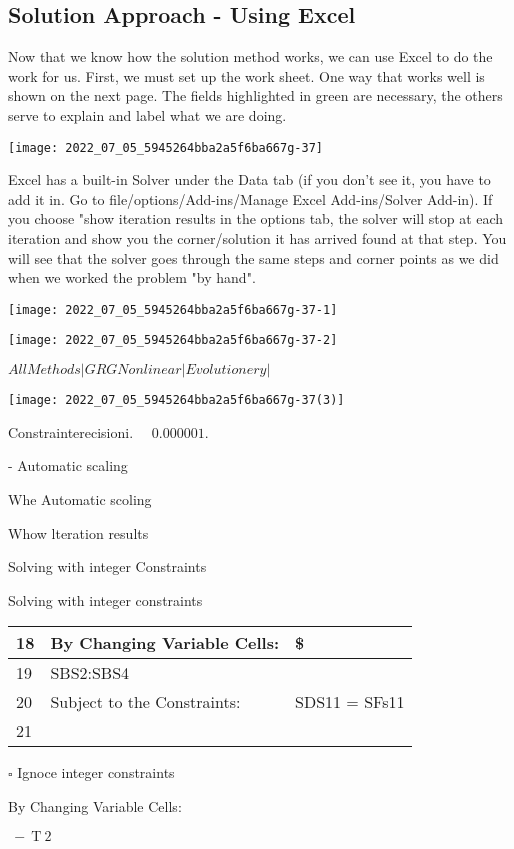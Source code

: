 \subsection{Solution Approach - Using Excel}
Now that we know how the solution method works, we can use Excel to do the work for us. First, we must set up the work sheet. One way that works well is shown on the next page. The fields highlighted in green are necessary, the others serve to explain and label what we are doing.

\texttt{[image: 2022\_07\_05\_5945264bba2a5f6ba667g-37]}

Excel has a built-in Solver under the Data tab (if you don't see it, you have to add it in. Go to file/options/Add-ins/Manage Excel Add-ins/Solver Add-in). If you choose "show iteration results in the options tab, the solver will stop at each iteration and show you the corner/solution it has arrived found at that step. You will see that the solver goes through the same steps and corner points as we did when we worked the problem "by hand".

\texttt{[image: 2022\_07\_05\_5945264bba2a5f6ba667g-37-1]}

\texttt{[image: 2022\_07\_05\_5945264bba2a5f6ba667g-37-2]}

$All Methods | GRG Nonlinear | Evolutionery |$

\texttt{[image: 2022\_07\_05\_5945264bba2a5f6ba667g-37(3)]}

Constrainterecisioni. $\quad 0.000001 .$

- Automatic scaling

Whe Automatic scoling

Whow lteration results

Solving with integer Constraints

Solving with integer constraints

\begin{tabular}{l|l|l|}
18 & By Changing Variable Cells: & \$ \\
\hline
19 & SBS2:SBS4 &  \\
20 & Subject to the Constraints: & SDS11 = SFs11 \\
\hline
21 &  &  \\
\hline
\end{tabular}

$\square$ Ignoce integer constraints

By Changing Variable Cells:

$\mathrm{~ - ~ T ~ 2 ~}$


